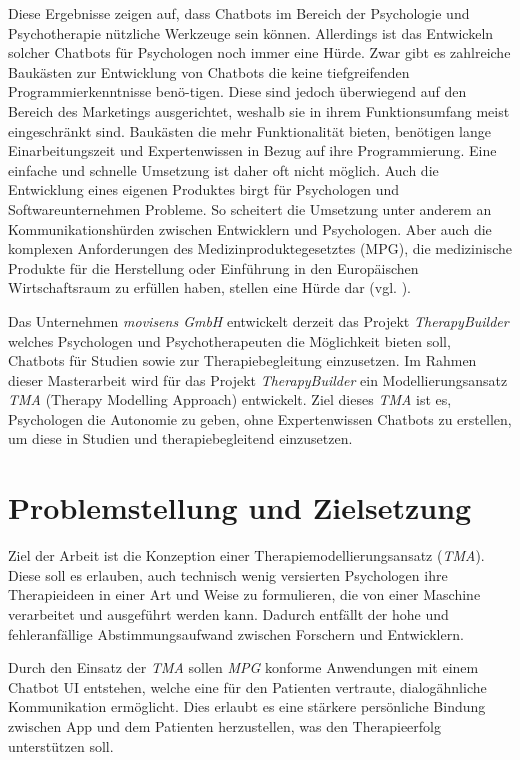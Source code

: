 Diese Ergebnisse zeigen auf, dass Chatbots im Bereich der Psychologie und Psychotherapie nützliche Werkzeuge sein können. Allerdings ist das Entwickeln solcher Chatbots für Psychologen noch immer eine Hürde. Zwar gibt es zahlreiche Baukästen zur Entwicklung von Chatbots die keine tiefgreifenden Programmierkenntnisse benö-tigen. Diese sind jedoch überwiegend auf den Bereich des Marketings ausgerichtet, weshalb sie in ihrem Funktionsumfang meist eingeschränkt sind. Baukästen die mehr Funktionalität bieten, benötigen lange Einarbeitungszeit und Expertenwissen in Bezug auf ihre Programmierung. Eine einfache und schnelle Umsetzung ist daher oft nicht möglich. Auch die Entwicklung eines eigenen Produktes birgt für Psychologen und Softwareunternehmen Probleme. So scheitert die Umsetzung unter anderem an Kommunikationshürden zwischen Entwicklern und Psychologen. Aber auch die komplexen Anforderungen des Medizinproduktegesetztes (MPG), die medizinische Produkte für die Herstellung oder Einführung in den Europäischen Wirtschaftsraum zu erfüllen haben, stellen eine Hürde dar (vgl. \cite{MPGnicht8:online}).  

Das Unternehmen \emph{movisens GmbH} entwickelt derzeit das Projekt \emph{TherapyBuilder} welches Psychologen und Psychotherapeuten die Möglichkeit bieten soll, Chatbots  für Studien sowie zur Therapiebegleitung einzusetzen. Im Rahmen dieser Masterarbeit wird für das Projekt \emph{TherapyBuilder} ein Modellierungsansatz \emph{TMA} (Therapy Modelling Approach) entwickelt. Ziel dieses \emph{TMA} ist es, Psychologen die Autonomie zu geben, ohne Expertenwissen Chatbots zu erstellen, um diese in Studien und therapiebegleitend einzusetzen.


\section{Problemstellung und Zielsetzung}

Ziel der Arbeit ist die Konzeption einer Therapiemodellierungsansatz (\emph{TMA}). Diese soll es erlauben, auch technisch wenig versierten Psychologen ihre Therapieideen in einer Art und Weise zu formulieren, die von einer Maschine verarbeitet und ausgeführt werden kann. Dadurch entfällt der hohe und fehleranfällige Abstimmungsaufwand zwischen Forschern und Entwicklern. 

Durch den Einsatz der \emph{TMA} sollen \emph{MPG} konforme Anwendungen mit einem Chatbot UI entstehen, welche eine für den Patienten vertraute, dialogähnliche Kommunikation ermöglicht. Dies erlaubt es eine stärkere persönliche Bindung zwischen App und dem Patienten herzustellen, was den Therapieerfolg unterstützen soll. 

